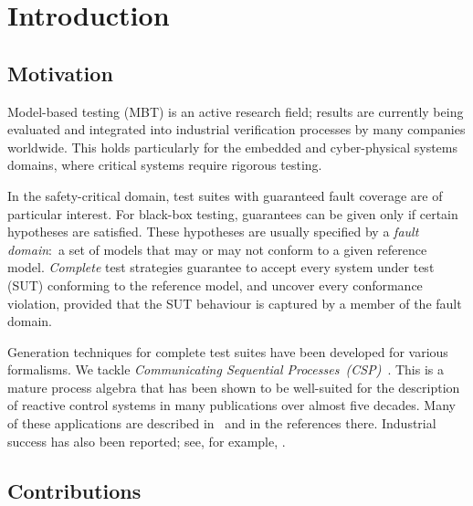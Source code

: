 
\section{Introduction}
\label{sec:intro}


\subsection{Motivation}

Model-based testing (MBT) is an active research field; results are currently
being evaluated and integrated into industrial verification processes by many
companies worldwide. This holds particularly for the embedded and
cyber-physical systems domains, where critical systems require rigorous
testing.

In the safety-critical domain, test suites with guaranteed fault coverage are
of particular interest. For black-box testing, guarantees can be given only
if certain hypotheses are satisfied. These hypotheses are usually specified
by a \emph{fault domain}:~a set of models that may or may not conform to a
given reference model. \emph{Complete} test strategies guarantee to accept
every  system under test (SUT) conforming to the reference model, and uncover
every conformance violation, provided that the SUT behaviour is captured by a
member of the fault domain.

Generation techniques for complete test suites have been developed for
various formalisms. We tackle \emph{Communicating Sequential
Processes~(CSP)}~\cite{Hoare:1985:CSP:3921,Roscoe2010}. This is a mature
process algebra that has been shown to be well-suited for the description of
reactive control systems in many publications over almost five decades. Many
of these applications are described in~\cite{Roscoe2010} and in the
references there. Industrial success has also been reported; see, for
example, \cite{976937,DBLP:conf/prdc/ShiPK99,DBLP:conf/amast/ButhKPS97}.


\subsection{Contributions}

